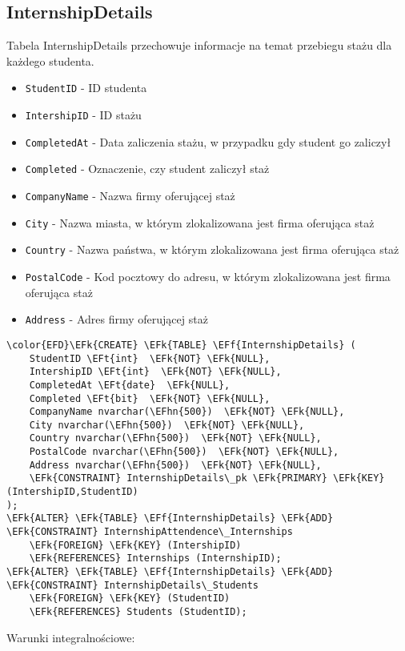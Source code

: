 \documentclass[11pt]{article}
\newcommand{\EFk}[1]{\textcolor{EFk}{\textbf{#1}}} %
\newcommand{\EFf}[1]{\textcolor{EFf}{#1}} %
\newcommand{\EFt}[1]{\textcolor{EFt}{\textbf{#1}}} %
\newcommand{\EFhn}[1]{\textcolor{EFhn}{#1}} %
\begin{document}
\subsection{InternshipDetails}
\label{sec:org5e46b79}
Tabela InternshipDetails przechowuje informacje na temat przebiegu stażu dla każdego studenta.
\begin{itemize}
\item \texttt{StudentID} - ID studenta
\item \texttt{IntershipID} - ID stażu
\item \texttt{CompletedAt} - Data zaliczenia stażu, w przypadku gdy student go zaliczył
\item \texttt{Completed} - Oznaczenie, czy student zaliczył staż
\item \texttt{CompanyName} - Nazwa firmy oferującej staż
\item \texttt{City} - Nazwa miasta, w którym zlokalizowana jest firma oferująca staż
\item \texttt{Country} - Nazwa państwa, w którym zlokalizowana jest firma oferująca staż
\item \texttt{PostalCode} - Kod pocztowy do adresu, w którym zlokalizowana jest firma oferująca staż
\item \texttt{Address} - Adres firmy oferującej staż
\end{itemize}
\begin{Code}
\begin{Verbatim}
\color{EFD}\EFk{CREATE} \EFk{TABLE} \EFf{InternshipDetails} (
    StudentID \EFt{int}  \EFk{NOT} \EFk{NULL},
    IntershipID \EFt{int}  \EFk{NOT} \EFk{NULL},
    CompletedAt \EFt{date}  \EFk{NULL},
    Completed \EFt{bit}  \EFk{NOT} \EFk{NULL},
    CompanyName nvarchar(\EFhn{500})  \EFk{NOT} \EFk{NULL},
    City nvarchar(\EFhn{500})  \EFk{NOT} \EFk{NULL},
    Country nvarchar(\EFhn{500})  \EFk{NOT} \EFk{NULL},
    PostalCode nvarchar(\EFhn{500})  \EFk{NOT} \EFk{NULL},
    Address nvarchar(\EFhn{500})  \EFk{NOT} \EFk{NULL},
    \EFk{CONSTRAINT} InternshipDetails\_pk \EFk{PRIMARY} \EFk{KEY}  (IntershipID,StudentID)
);
\EFk{ALTER} \EFk{TABLE} \EFf{InternshipDetails} \EFk{ADD} \EFk{CONSTRAINT} InternshipAttendence\_Internships
    \EFk{FOREIGN} \EFk{KEY} (IntershipID)
    \EFk{REFERENCES} Internships (InternshipID);
\EFk{ALTER} \EFk{TABLE} \EFf{InternshipDetails} \EFk{ADD} \EFk{CONSTRAINT} InternshipDetails\_Students
    \EFk{FOREIGN} \EFk{KEY} (StudentID)
    \EFk{REFERENCES} Students (StudentID);
\end{Verbatim}
\end{Code}
Warunki integralnościowe:
\end{document}
